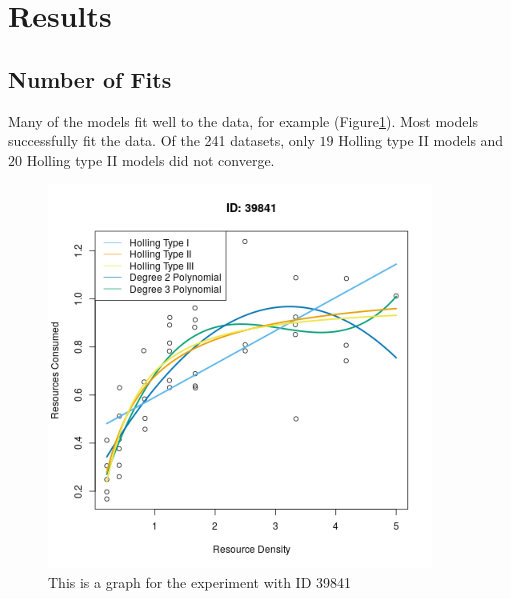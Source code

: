 \documentclass{article}
\begin{document}
\section{Results}
\subsection{Number of Fits}
Many of the models fit well to the data, for example (Figure\ref{fig:2}). Most models successfully fit the data. Of the 241 datasets, only $19$ Holling type II models and $20$ Holling type II models did not converge.  %
\begin{figure}[h!] %
    \centering
    \includegraphics[width=4in]{../Results/Plots/39841.png}
    \caption{This is a graph for the experiment with ID 39841}
    \label{fig:2}
\end{figure}
\end{document}
